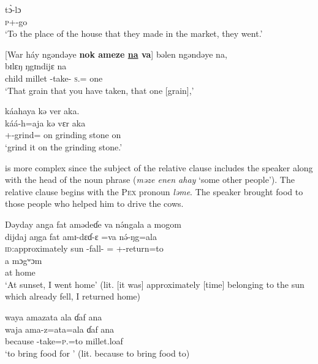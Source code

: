  \medskip
 \gll     t\`{ɔ}-lɔ\\
      \textsc{p}+{\PFV}-go\\
\glt  ‘To the place of the house that they made in the market, they went.’
\z


\ea \label{ex:5:105}
{}[War  háy  ngəndəye  \textbf{nok  ameze \underline{na} va}]  bəlen  ngəndəye  na,\\  
\gll  [war  haj      ŋgɪndijɛ   \textbf{nɔkʷ} \textbf{amɛ-ʒ-ɛ} \textbf{\underline{na}}\textbf{=va}]    bɪlɛŋ  ŋgɪndijɛ  na\\
      child    millet  {\DEM}  {\twoS}  {\DEP}-take-{\CL}  \textsc{s}.{\DO}={\PRF}  one   {\DEM}  {\PSP}\\
\glt ‘That grain that you have taken, that one [grain],’
      
\medskip
káahaya  kə  ver  aka.\\
\gll  káá-h=aja            kə  vɛr             aka\\
      {\twoS}+{\POT}-grind={\PLU}  on  {grinding stone}       on\\
\glt  ‘grind it on the grinding stone.’
\z

 is more complex since the subject of the relative clause includes the speaker along with the head of the noun phrase (\textit{məze  enen  ahay} ‘some other people’).  The relative clause begins with the \textsc{Pex} pronoun \textit{ləme}. The speaker brought food to those people who helped him to drive the cows. 

\largerpage
\ea \label{ex:5:106}
Dəyday  anga  fat  amədeɗe  va  n\'{ə}ngala  a  mogom\\  
\gll  dijdaj     aŋga   fat   amɪ-dɛɗ-ɛ  =va  n\'{ə}-ŋg=ala  \\
      \textsc{id}:approximately  {\POSS}  sun  {\DEP}-fall-{\CL}   ={\PRF}  {\oneS}+{\IFV}-return=to  \\
      
 \medskip
 \gll     a  mɔgʷɔm\\
      at  home\\
 \glt ‘At sunset, I went home’ (lit. [it was] approximately [time] belonging to the sun which already fell, I returned home)
      
\medskip
waya  amazata  ala  ɗaf  ana  \\
\gll waja ama-z=ata=ala ɗaf ana \\
      because  {\DEP}-take=\textsc{p}.{\IO}=to  {millet.loaf}  {\DAT} \\
\glt ‘to bring food for ’ (lit. because to bring food to)
     
